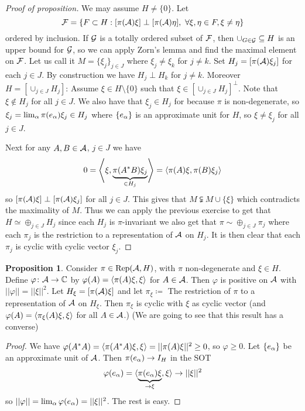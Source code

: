 \documentclass[10pt,english,a4paper]{article}
\theoremstyle{definition}
\newtheorem*{proposition}{Proposition}
\DeclareMathOperator{\Rep}{Rep}
\def\vphi{\varphi}
\begin{document}
\begin{proof}[Proof of proposition]
    We may assume $H\neq \{0\}$. Let 
\[ \mathcal{F} = \{ F\subset H : [\pi(\mathcal{A})\xi] \perp [\pi(\mathcal{A})\eta], ~\forall \xi,\eta \in F, \xi\neq \eta\} \]
ordered by inclusion. If $\mathcal{G}$ is a totally ordered subset of $\mathcal{F}$, then 
$\cup_{G \in \mathcal{G}} \subseteq H$ is an upper bound for $\mathcal{G}$, so we can apply 
Zorn's lemma and find the maximal element on $\mathcal{F}$. Let us call it 
$M  = \{\xi_j\}_{j\in J}$ where $\xi_j\neq \xi_k$ for $j\neq k$. Set
$H_j =[\pi(\mathcal{A})\xi_j]$ for each $j\in J$. By construction we have 
$H_j \perp H_k$ for $j\neq k$. Moreover 
$H = [\cup_{j\in J}H_j]$: Assume $\xi \in H\setminus \{0\}$ such that 
$\xi \in [\cup_{j\in J}H_j]^{\perp}$. Note that $\xi \not\in H_j$ for all $j\in J$.
We also have that $\xi_j \in H_j$ for because $\pi$ is non-degenerate, so 
$\xi_j = \lim_{\alpha}\pi(e_{\alpha})\xi_j \in H_j$ where $\{e_{\alpha}\}$ is an approximate
unit for $H$, so $\xi\neq \xi_j$ for all $j\in J$.

Next for any $A,B \in \mathcal{A}$, $j\in J$ we have \[ 0 =
\left\langle \xi,\underbrace{\pi(A^*B)\xi_j}_{\in H_j} \right\rangle = \left\langle \pi(A)\xi,\pi(B)\xi_j \right\rangle  \] so
$[\pi(\mathcal{A})\xi]\perp [\pi(\mathcal{A})\xi_j]$ for all $j\in J$. This gives that $M
\subsetneqq M \cup \{\xi\}$ which contradicts the maximality of $M$. Thus we
can apply the previous exercise to get that $H \simeq \oplus_{j\in J} H_j$
since each $H_j$ is $\pi$-invariant we also get that $\pi\sim \oplus_{j\in J}
\pi_j$ where each $\pi_j$ is the restriction to a representation of $\mathcal{A}$ on
$H_j$. It is then clear that each $\pi_j$ is cyclic with cyclic vector $\xi_j$.
\end{proof}

\begin{proposition}
    Consider $\pi \in \Rep(\As,H)$, with $\pi$ non-degenerate and $\xi \in H$.
Define $\vphi\colon \As \to \C$ by $\vphi(A) = \ind{\pi(A)\xi,\xi}$ for $A\in
\mathcal{A}$. Then $\vphi$ is  positive on $\mathcal{A}$ with 
$||\vphi|| = ||\xi||^2$. Let $H_{\xi} = [\pi(\mathcal{A})\xi]$ and let 
$\pi_{\xi} \coloneqq $ The restriction of $\pi$ to a representation of $\mathcal{A}$ on 
$H_{\xi}$. Then $\pi_{\xi}$ is cyclic with $\xi$ as cyclic vector 
(and $\vphi(A) = \ind{\pi_{\xi}(A)\xi,\xi} $ for all $A \in \mathcal{A}$.)
(We are going to see that this result has a converse)
\end{proposition}
\begin{proof}
   We have 
$\vphi(A^*A) = \ind{\pi(A^*A)\xi,\xi} = ||\pi(A)\xi||^2 \geq 0$, so $\vphi\geq 0$.
Let $\{e_{\alpha}\}$ be an approximate unit of $\mathcal{A}$. Then 
$\pi(e_{\alpha}) \to I_{H}$ in the SOT
\begin{align*}
    \vphi(e_{\al}) = \indi{\ub{\pi(e_{\al})\xi}_{\to\xi},\xi}\to ||\xi||^2
\end{align*}
so $||\vphi|| = \lim_{\al}\vphi(e_{\al}) = ||\xi||^2$. The rest is easy. 
\end{proof}
\end{document}
